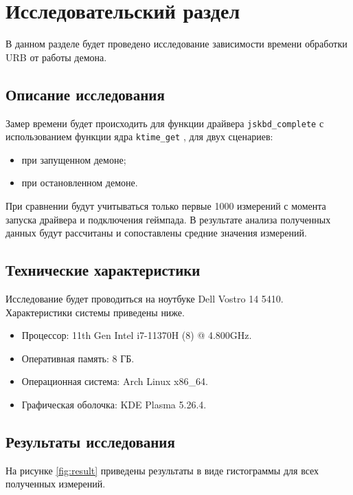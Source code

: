 \section{Исследовательский раздел}

В данном разделе будет проведено исследование зависимости времени обработки URB от работы демона.

\subsection{Описание исследования}

Замер времени будет происходить для функции драйвера \texttt{jskbd\_complete} с использованием функции ядра \texttt{ktime\_get} \cite{ktime-get}, для двух сценариев:

\begin{itemize}[leftmargin=1.6\parindent]
    \item при запущенном демоне;
    \item при остановленном демоне.
\end{itemize}

При сравнении будут учитываться только первые 1000 измерений с момента запуска драйвера и подключения геймпада. В результате анализа полученных данных будут рассчитаны и сопоставлены средние значения измерений.

\subsection{Технические характеристики}

Исследование будет проводиться на ноутбуке Dell Vostro 14 5410. Характеристики системы приведены ниже.

\begin{itemize}[leftmargin=1.6\parindent]
    \item Процессор: 11th Gen Intel i7-11370H (8) @ 4.800GHz.
    \item Оперативная память: 8 ГБ.
    \item Операционная система: Arch Linux x86\_64.
    \item Графическая оболочка: KDE Plasma 5.26.4.
\end{itemize}

\subsection{Результаты исследования}

На рисунке \ref{fig:result} приведены результаты в виде гистограммы для всех полученных измерений.

